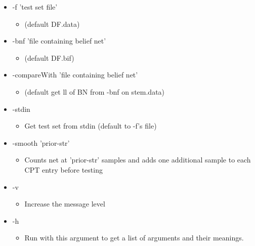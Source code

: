 \begin{itemize}
\item -f 'test set file'\begin{itemize}
\item (default DF.data)\end{itemize}
\item -bnf 'file containing belief net'\begin{itemize}
\item (default DF.bif)\end{itemize}
\item -compare\-With 'file containing belief net'\begin{itemize}
\item (default get ll of BN from -bnf on stem.data)\end{itemize}
\item -stdin\begin{itemize}
\item Get test set from stdin (default to -f's file)\end{itemize}
\item -smooth 'prior-str'\begin{itemize}
\item Counts net at 'prior-str' samples and adds one additional sample to each CPT entry before testing\end{itemize}
\item -v\begin{itemize}
\item Increase the message level\end{itemize}
\item -h\begin{itemize}
\item Run with this argument to get a list of arguments and their meanings.\par
\end{itemize}
\end{itemize}



